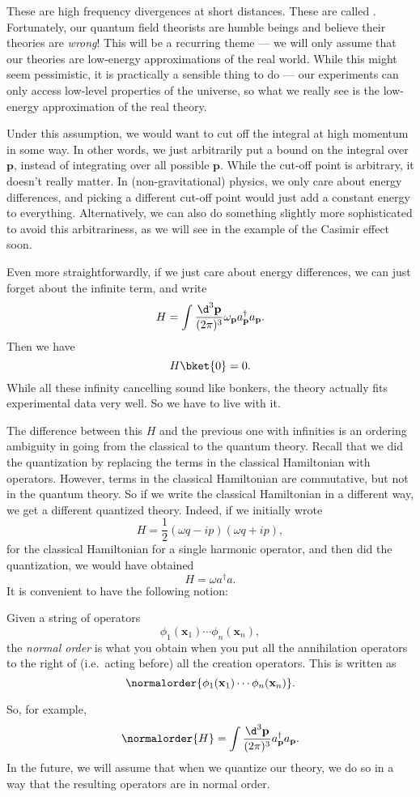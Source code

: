 \documentclass[a4paper]{article}
\begin{document}
These are high frequency divergences at short distances. These are called . Fortunately, our quantum field theorists are humble beings and believe their theories are \emph{wrong}! This will be a recurring theme --- we will only assume that our theories are low-energy approximations of the real world. While this might seem pessimistic, it is practically a sensible thing to do --- our experiments can only access low-level properties of the universe, so what we really see is the low-energy approximation of the real theory.

Under this assumption, we would want to cut off the integral at high momentum in some way. In other words, we just arbitrarily put a bound on the integral over $\mathbf{p}$, instead of integrating over all possible $\mathbf{p}$. While the cut-off point is arbitrary, it doesn't really matter. In (non-gravitational) physics, we only care about energy differences, and picking a different cut-off point would just add a constant energy to everything. Alternatively, we can also do something slightly more sophisticated to avoid this arbitrariness, as we will see in the example of the Casimir effect soon.

Even more straightforwardly, if we just care about energy differences, we can just forget about the infinite term, and write
\[
  H = \int \frac{\d^3 \mathbf{p}}{(2\pi)^3} \omega_\mathbf{p} a_\mathbf{p}^\dagger a_\mathbf{p}.
\]
Then we have
\[
  H \bket{0} = 0.
\]
While all these infinity cancelling sound like bonkers, the theory actually fits experimental data very well. So we have to live with it.

The difference between this $H$ and the previous one with infinities is an ordering ambiguity in going from the classical to the quantum theory. Recall that we did the quantization by replacing the terms in the classical Hamiltonian with operators. However, terms in the classical Hamiltonian are commutative, but not in the quantum theory. So if we write the classical Hamiltonian in a different way, we get a different quantized theory. Indeed, if we initially wrote
\[
  H = \frac{1}{2} (\omega q - ip)(\omega q + ip),
\]
for the classical Hamiltonian for a single harmonic operator, and then did the quantization, we would have obtained
\[
  H = \omega a^\dagger a.
\]
It is convenient to have the following notion:
\begin{defi}
  Given a string of operators
  \[
    \phi_1(\mathbf{x}_1) \cdots \phi_n(\mathbf{x}_n),
  \]
  the \emph{normal order} is what you obtain when you put all the annihilation operators to the right of (i.e.\ acting before) all the creation operators. This is written as
  \[
    \normalorder{\phi_1(\mathbf{x}_1) \cdots \phi_n(\mathbf{x}_n)}.
  \]
\end{defi}
So, for example,
\[
  \normalorder{H} = \int \frac{\d^3 \mathbf{p}}{(2\pi)^3} a_\mathbf{p}^\dagger a_\mathbf{p}.
\]
In the future, we will assume that when we quantize our theory, we do so in a way that the resulting operators are in normal order.
\end{document}
